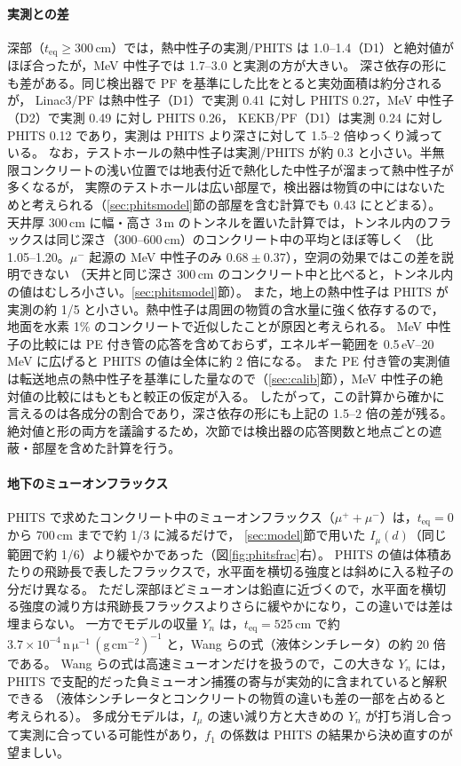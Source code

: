 \documentclass[a4paper,11pt]{ltjsarticle}
\newcommand{\teq}{t_{\mathrm{eq}}}
\begin{document}
\paragraph{実測との差}
深部（$\teq\ge300$\,cm）では，熱中性子の実測/PHITS は 1.0--1.4（D1）と絶対値がほぼ合ったが，MeV 中性子では 1.7--3.0 と実測の方が大きい。
深さ依存の形にも差がある。同じ検出器で PF を基準にした比をとると実効面積は約分されるが，
Linac3/PF は熱中性子（D1）で実測 0.41 に対し PHITS 0.27，MeV 中性子（D2）で実測 0.49 に対し PHITS 0.26，
KEKB/PF（D1）は実測 0.24 に対し PHITS 0.12 であり，実測は PHITS より深さに対して 1.5--2 倍ゆっくり減っている。
なお，テストホールの熱中性子は実測/PHITS が約 0.3 と小さい。半無限コンクリートの浅い位置では地表付近で熱化した中性子が溜まって熱中性子が多くなるが，
実際のテストホールは広い部屋で，検出器は物質の中にはないためと考えられる（\ref{sec:phitsmodel}節の部屋を含む計算でも 0.43 にとどまる）。
天井厚 300\,cm に幅・高さ 3\,m のトンネルを置いた計算では，トンネル内のフラックスは同じ深さ（300--600\,cm）のコンクリート中の平均とほぼ等しく
（比 1.05--1.20。$\mu^-$ 起源の MeV 中性子のみ $0.68\pm0.37$），空洞の効果ではこの差を説明できない
（天井と同じ深さ 300\,cm のコンクリート中と比べると，トンネル内の値はむしろ小さい。\ref{sec:phitsmodel}節）。
また，地上の熱中性子は PHITS が実測の約 1/5 と小さい。熱中性子は周囲の物質の含水量に強く依存するので，地面を水素 1\% のコンクリートで近似したことが原因と考えられる。
MeV 中性子の比較には PE 付き管の応答を含めておらず，エネルギー範囲を 0.5\,eV--20\,MeV に広げると PHITS の値は全体に約 2 倍になる。
また PE 付き管の実測値は転送地点の熱中性子を基準にした量なので（\ref{sec:calib}節），MeV 中性子の絶対値の比較にはもともと較正の仮定が入る。
したがって，この計算から確かに言えるのは各成分の割合であり，深さ依存の形にも上記の 1.5--2 倍の差が残る。
絶対値と形の両方を議論するため，次節では検出器の応答関数と地点ごとの遮蔽・部屋を含めた計算を行う。

\paragraph{地下のミューオンフラックス}
PHITS で求めたコンクリート中のミューオンフラックス（$\mu^++\mu^-$）は，$\teq=0$ から 700\,cm までで約 1/3 に減るだけで，
\ref{sec:model}節で用いた $I_\mu(d)$（同じ範囲で約 1/6）より緩やかであった（図\ref{fig:phitsfrac}右）。
PHITS の値は体積あたりの飛跡長で表したフラックスで，水平面を横切る強度とは斜めに入る粒子の分だけ異なる。
ただし深部ほどミューオンは鉛直に近づくので，水平面を横切る強度の減り方は飛跡長フラックスよりさらに緩やかになり，この違いでは差は埋まらない。
一方でモデルの収量 $Y_n$ は，$\teq=525$\,cm で約 $3.7\times10^{-4}\,\mathrm{n\,\mu^{-1}\,(g\,cm^{-2})^{-1}}$ と，Wang らの式（液体シンチレータ）の約 20 倍である。
Wang らの式は高速ミューオンだけを扱うので，この大きな $Y_n$ には，PHITS で支配的だった負ミューオン捕獲の寄与が実効的に含まれていると解釈できる
（液体シンチレータとコンクリートの物質の違いも差の一部を占めると考えられる）。
多成分モデルは，$I_\mu$ の速い減り方と大きめの $Y_n$ が打ち消し合って実測に合っている可能性があり，$f_1$ の係数は PHITS の結果から決め直すのが望ましい。
\end{document}

